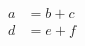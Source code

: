 \documentclass{article}
\begin{document}
\begin{align*}
a &= b+c \\
d &= e+f
\end{align*}
\end{document}
